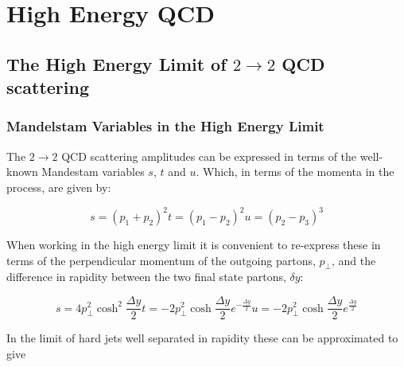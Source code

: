 \chapter{High Energy QCD}
\label{chap:HEQCD}

\section{The High Energy Limit of $2\rightarrow2$ QCD scattering}

	\subsection{Mandelstam Variables in the High Energy Limit}
	\label{sub:Mandelstam Variables in the High Energy Limit}

	The $2\rightarrow 2$ QCD scattering amplitudes can be expressed in terms of the well-known Mandestam variables $s$, $t$ and $u$.  Which, in terms of the momenta in the process, are given by:

	\begin{subequations}
		\begin{equation}
			s = (p_1 + p_2)^2
		\end{equation}
		\begin{equation}
			t = (p_1 - p_2)^2
		\end{equation}
		\begin{equation}
			u = (p_2 - p_3)^3
		\end{equation}
	\end{subequations}

	When working in the high energy limit it is convenient to re-express these in terms of the perpendicular momentum of the outgoing partons, $p_\perp$, and the difference in rapidity between the two final state partons, $\delta y$:

	\begin{subequations}
		\begin{equation}
			s = 4p_\perp^2 \cosh^2\frac{\Delta y}{2}
		\end{equation}
		\begin{equation}
			t = -2p_\perp^2 \cosh\frac{\Delta y}{2}e^{-\frac{\Delta y}{2}}
		\end{equation}
		\begin{equation}
			u = -2p_\perp^2 \cosh\frac{\Delta y}{2}e^{\frac{\Delta y}{2}}
		\end{equation}
	\end{subequations}

	In the limit of hard jets well separated in rapidity these can be approximated to give

